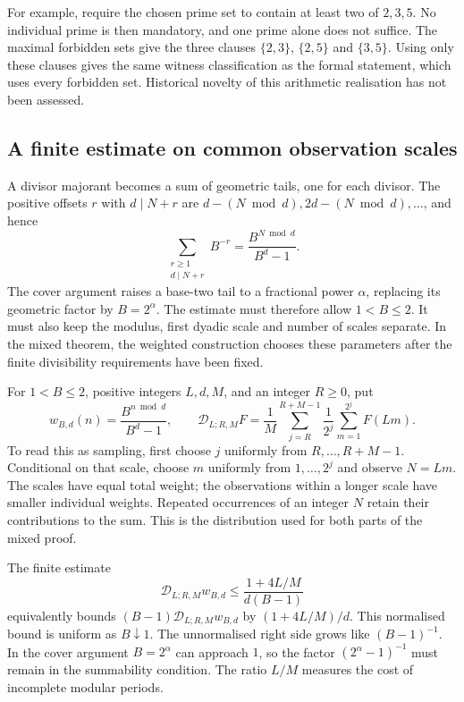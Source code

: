 \documentclass[11pt]{article}
\theoremstyle{plain}
\theoremstyle{definition}
\theoremstyle{remark}
\begin{document}
For example, require the chosen prime set to contain at least two
of $2,3,5$. No individual prime is then mandatory, and one prime
alone does not suffice. The maximal
forbidden sets give the three clauses $\{2,3\}$, $\{2,5\}$ and
$\{3,5\}$. Using only these clauses gives the same witness classification
as the formal statement, which uses every forbidden set. Historical
novelty of this arithmetic realisation has not been assessed.

\subsection{A finite estimate on common observation scales}\label{sec:257-common-kernel}
A divisor majorant becomes a sum of geometric tails, one for each
divisor. The positive offsets $r$ with $d\mid N+r$ are
$d-(N\bmod d),2d-(N\bmod d),\ldots$, and hence
\[
 \sum_{\substack{r\ge1\\d\mid N+r}}B^{-r}
 =\frac{B^{N\bmod d}}{B^d-1}.
\]
The cover argument raises a base-two tail to a fractional power $\alpha$,
replacing its geometric factor by $B=2^\alpha$. The estimate must
therefore allow $1<B\le2$. It must also keep the modulus, first dyadic
scale and number of scales separate. In the mixed theorem, the weighted
construction chooses these parameters after the finite divisibility
requirements have been fixed.

For $1<B\le2$, positive integers $L,d,M$, and an integer $R\ge0$, put
\[
 w_{B,d}(n)=\frac{B^{n\bmod d}}{B^d-1},\qquad
 \mathscr D_{L;R,M}F
 =\frac1M\sum_{j=R}^{R+M-1}\frac1{2^j}
      \sum_{m=1}^{2^j}F(Lm).
\]
To read this as sampling, first choose $j$ uniformly from
$R,\ldots,R+M-1$. Conditional on that scale, choose $m$ uniformly from
$1,\ldots,2^j$ and observe $N=Lm$. The scales have equal total weight;
the observations within a longer scale have smaller individual weights.
Repeated occurrences of an integer $N$ retain their contributions to the
sum. This is the distribution used for both parts of the mixed proof.

The finite estimate
\begin{equation}
 \mathscr D_{L;R,M}w_{B,d}
 \le\frac{1+4L/M}{d(B-1)}
 \label{eq:257-mixed-finite-kernel}
\end{equation}
equivalently bounds $(B-1)\mathscr D_{L;R,M}w_{B,d}$ by
$(1+4L/M)/d$.  This normalised bound is uniform as $B\downarrow1$.
The unnormalised right side grows like $(B-1)^{-1}$. In the cover
argument $B=2^\alpha$ can approach $1$, so the factor
$(2^\alpha-1)^{-1}$ must remain in the summability condition.
The ratio $L/M$ measures the cost of incomplete modular periods.
\end{document}

